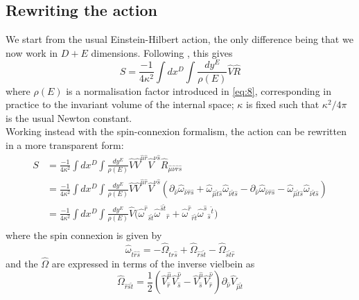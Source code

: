 \documentclass{article}
\begin{document}
\subsection{Rewriting the action}
We start from the usual Einstein-Hilbert action, the only difference being that we now work in $D+E$ dimensions. Following \cite{scherk1979get}, this gives
\begin{equation} \label{eq:8}
    \boxed{S = \frac{-1}{4\kappa^2}\int d x^D \int \frac{d y ^E}{\rho(E)} \hat V \hat R}
\end{equation}
where $\rho(E)$ is a normalisation factor introduced in \eqref{eq:8}, corresponding in practice to the invariant volume of the internal space; $\kappa$ is fixed such that $\kappa^2/4\pi$ is the usual Newton constant.\\
Working instead with the spin-connexion formalism, the action can be rewritten in a more transparent form:
\begin{equation}
    \begin{aligned}
        S &= \frac{-1}{4\kappa^2}\int d x^D \int \frac{d y ^E}{\rho(E)} \hat V \hat V^{\hat \mu \hat r}\hat V^{\hat \nu \hat s} \hat R_{\hat \mu \hat \nu \hat r \hat s}\\
        &= \frac{-1}{4\kappa^2}\int d x^D \int \frac{d y ^E}{\rho(E)} \hat V \hat V^{\hat \mu \hat r}\hat V^{\hat \nu \hat s}(\partial_{\hat \nu} \hat \omega_{\hat \nu \hat r \hat s} + \hat \omega_{\hat \mu \hat t \hat s} \hat \omega_{\hat \nu \hat t \hat s}-\partial_{\hat \nu} \hat \omega_{\hat \nu \hat r \hat s} - \hat \omega_{\hat \mu \hat t \hat s} \hat \omega_{\hat \nu \hat t \hat s})\\
        &=\frac{-1}{4\kappa^2}\int d x^D \int \frac{d y ^E}{\rho(E)} \hat V \big(\hat \omega^{\hat r}{}_{\hat s \hat t} \hat \omega^{\hat s \hat t}{}_{\hat r} + \hat \omega^{\hat r}{}_{ \hat r \hat t}\hat \omega^{\hat s }{}_{\hat s}{}^{\hat t}\big)\\
    \end{aligned}
    \end{equation}
where the spin connexion is given by
\begin{equation} \label{eq:10}
    \hat \omega_{ \hat t \hat r \hat s} = - \hat \Omega_{\hat t \hat r \hat s} +\hat \Omega_{\hat r \hat s \hat t} - \hat \Omega_{\hat s \hat t \hat r}  
\end{equation}
and the $\hat \Omega$ are expressed in terms of the inverse vielbein as
\begin{equation} \label{eq:11}
    \hat \Omega_{\hat r \hat s \hat t} = \frac{1}{2}(\hat V^{\hat \mu}_{\hat  r} \hat V^{\hat \nu}_{\hat s}-\hat V^{\hat \mu}_{\hat  s} \hat V^{\hat \nu}_{\hat r})\partial_{\hat \nu} \hat V_{\hat \mu \hat t}
\end{equation}
\end{document}
